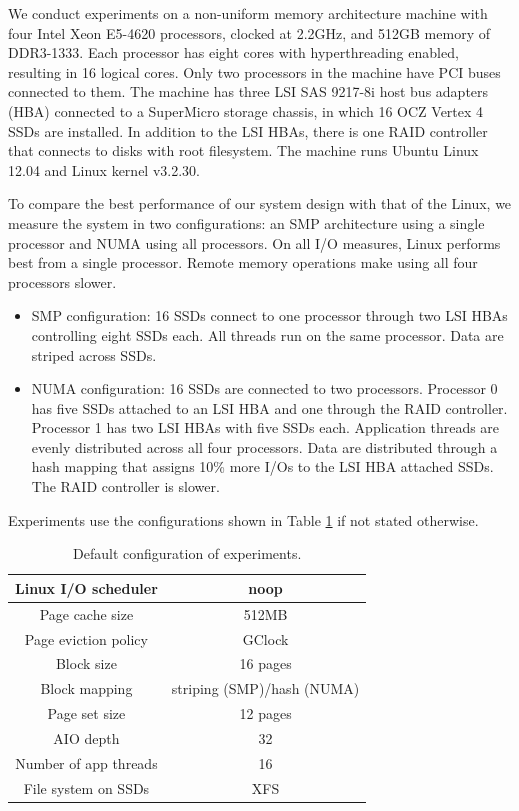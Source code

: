 We conduct experiments on a non-uniform memory architecture machine
with four Intel Xeon E5-4620 processors, clocked at 2.2GHz, and 512GB
memory of DDR3-1333. Each processor has eight cores with hyperthreading enabled, 
resulting in 16 logical cores. Only two processors in the machine have
PCI buses connected to them. The machine has three LSI
SAS 9217-8i host bus adapters (HBA) connected to a SuperMicro storage chassis, 
in which 16 OCZ Vertex 4  SSDs are installed. In addition to the LSI HBAs,
there is one RAID controller that connects to disks with root filesystem.
The machine runs Ubuntu Linux 12.04 and Linux kernel v3.2.30.

To compare the best performance of our system design with that of the Linux, 
we measure the system in two configurations: an SMP architecture
using a single processor and NUMA using all processors.  On all I/O measures,
Linux performs best from a single processor.  Remote memory operations make using
all four processors slower.  
\vspace{-10pt}
\begin{itemize}
\addtolength{\itemsep}{-5pt}
\item SMP configuration: 16 SSDs connect to one processor through
	two LSI HBAs controlling eight SSDs each. All threads run on the same processor.
	Data are striped across SSDs.
\item NUMA configuration: 16 SSDs are connected to two processors. Processor 0
  has five SSDs attached to an LSI HBA and one through the RAID controller.  
  Processor 1 has two LSI HBAs with five SSDs each. 
  Application threads are evenly distributed across all four processors.
	Data are distributed through a hash mapping that assigns 10\% more I/Os to the LSI HBA attached SSDs.
  The RAID controller is slower.
\end{itemize}
\vspace{-10pt}
Experiments use the configurations shown in Table
\ref{default_conf} if not stated otherwise.
\begin{table}
\begin{center}
\small
\begin{tabular}{|c|c|}
\hline
Linux I/O scheduler & noop \\
\hline
Page cache size & 512MB \\
\hline
Page eviction policy & GClock \\
\hline
Block size & 16 pages \\
\hline
Block mapping & striping (SMP)/hash (NUMA) \\
\hline
Page set size & 12 pages \\
\hline
AIO depth & 32 \\
\hline
Number of app threads & 16 \\
\hline
File system on SSDs & XFS \\
\hline
\end{tabular}
\normalsize
\end{center}
\caption{Default configuration of experiments.}
\label{default_conf}
\end{table}

